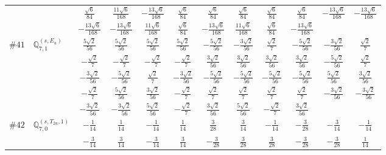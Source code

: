 \documentclass[fleqn,9pt,landscape]{jsarticle}
\begin{document}
\begin{center}
\begin{longtable}{lcccccccccc}
& $ \frac{\sqrt{6}}{84} $ & $ \frac{11 \sqrt{6}}{168} $ & $ - \frac{13 \sqrt{6}}{168} $ & $ \frac{\sqrt{6}}{84} $ & $ \frac{\sqrt{6}}{84} $ & $ \frac{\sqrt{6}}{84} $ & $ \frac{\sqrt{6}}{84} $ & $ \frac{\sqrt{6}}{84} $ & $ - \frac{13 \sqrt{6}}{168} $ & $ - \frac{13 \sqrt{6}}{168} $ \\
& $ - \frac{13 \sqrt{6}}{168} $ & $ - \frac{13 \sqrt{6}}{168} $ & $ \frac{11 \sqrt{6}}{168} $ & $ \frac{\sqrt{6}}{84} $ & $ - \frac{13 \sqrt{6}}{168} $ & $ \frac{11 \sqrt{6}}{168} $ & $ \frac{\sqrt{6}}{84} $ & $ - \frac{13 \sqrt{6}}{168} $ & $  $ & $  $ \\ \hline
$ \#41\quad \mathbb{Q}_{7,1}^{(s,E_{u})} $ & $ \frac{5 \sqrt{2}}{56} $ & $ \frac{5 \sqrt{2}}{56} $ & $ \frac{5 \sqrt{2}}{56} $ & $ \frac{5 \sqrt{2}}{56} $ & $ - \frac{5 \sqrt{2}}{56} $ & $ - \frac{3 \sqrt{2}}{56} $ & $ \frac{\sqrt{2}}{7} $ & $ - \frac{5 \sqrt{2}}{56} $ & $ - \frac{3 \sqrt{2}}{56} $ & $ \frac{\sqrt{2}}{7} $ \\
& $ - \frac{\sqrt{2}}{7} $ & $ - \frac{\sqrt{2}}{7} $ & $ - \frac{\sqrt{2}}{7} $ & $ - \frac{\sqrt{2}}{7} $ & $ \frac{3 \sqrt{2}}{56} $ & $ \frac{3 \sqrt{2}}{56} $ & $ \frac{3 \sqrt{2}}{56} $ & $ \frac{3 \sqrt{2}}{56} $ & $ - \frac{5 \sqrt{2}}{56} $ & $ \frac{\sqrt{2}}{7} $ \\
& $ - \frac{3 \sqrt{2}}{56} $ & $ - \frac{5 \sqrt{2}}{56} $ & $ \frac{\sqrt{2}}{7} $ & $ - \frac{3 \sqrt{2}}{56} $ & $ - \frac{5 \sqrt{2}}{56} $ & $ - \frac{5 \sqrt{2}}{56} $ & $ - \frac{5 \sqrt{2}}{56} $ & $ - \frac{5 \sqrt{2}}{56} $ & $ \frac{5 \sqrt{2}}{56} $ & $ \frac{3 \sqrt{2}}{56} $ \\
& $ - \frac{\sqrt{2}}{7} $ & $ \frac{5 \sqrt{2}}{56} $ & $ \frac{3 \sqrt{2}}{56} $ & $ - \frac{\sqrt{2}}{7} $ & $ \frac{\sqrt{2}}{7} $ & $ \frac{\sqrt{2}}{7} $ & $ \frac{\sqrt{2}}{7} $ & $ \frac{\sqrt{2}}{7} $ & $ - \frac{3 \sqrt{2}}{56} $ & $ - \frac{3 \sqrt{2}}{56} $ \\
& $ - \frac{3 \sqrt{2}}{56} $ & $ - \frac{3 \sqrt{2}}{56} $ & $ \frac{5 \sqrt{2}}{56} $ & $ - \frac{\sqrt{2}}{7} $ & $ \frac{3 \sqrt{2}}{56} $ & $ \frac{5 \sqrt{2}}{56} $ & $ - \frac{\sqrt{2}}{7} $ & $ \frac{3 \sqrt{2}}{56} $ & $  $ & $  $ \\ \hline
$ \#42\quad \mathbb{Q}_{7,0}^{(s,T_{2u},1)} $ & $ - \frac{1}{14} $ & $ \frac{1}{14} $ & $ - \frac{1}{14} $ & $ \frac{1}{14} $ & $ \frac{3}{28} $ & $ \frac{3}{14} $ & $ - \frac{1}{14} $ & $ - \frac{3}{28} $ & $ - \frac{3}{14} $ & $ - \frac{1}{14} $ \\
& $ - \frac{3}{14} $ & $ \frac{3}{14} $ & $ - \frac{3}{14} $ & $ \frac{3}{14} $ & $ - \frac{3}{28} $ & $ \frac{3}{28} $ & $ \frac{3}{28} $ & $ - \frac{3}{28} $ & $ - \frac{3}{28} $ & $ \frac{1}{14} $ \\

\end{longtable}
\end{center}
\end{document}
